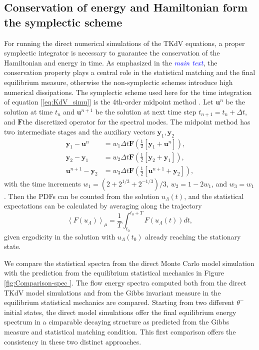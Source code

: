 \documentclass[9pt,twoside,lineno]{pnas-new}
\theoremstyle{plain}
\theoremstyle{plain}
\begin{document}
\subsection{Conservation of energy and Hamiltonian form the symplectic scheme}

For running the direct numerical simulations of the TKdV equations,
a proper symplectic integrator is necessary to guarantee the conservation
of the Hamiltonian and energy in time. As emphasized in the \textcolor{blue}{\emph{main
text}}, the conservation property plays a central role in the statistical
matching and the final equilibrium measure, otherwise the non-symplectic
schemes introduce high numerical dissipations. The symplectic scheme
used here for the time integration of equation [\ref{eq:KdV_simu}]
is the 4th-order midpoint method \cite{mclachlan1993symplectic}.
Let $\mathbf{u}^{n}$ be the solution at time $t_{n}$ and $\mathbf{u}^{n+1}$
be the solution at next time step $t_{n+1}=t_{n}+\Delta t$, and $\mathbf{F}$the
discretized operator for the spectral modes. The midpoint method has
two intermediate stages and the auxiliary vectors $\mathbf{y}_{1},\mathbf{y}_{2}$
\[
\begin{aligned}\mathbf{y}_{1}-\mathbf{u}^{n} & =w_{1}\Delta t\mathbf{F}\left(\frac{1}{2}\left[\mathbf{y}_{1}+\mathbf{u}^{n}\right]\right),\\
\mathbf{y}_{2}-\mathbf{y}_{1} & =w_{2}\Delta t\mathbf{F}\left(\frac{1}{2}\left[\mathbf{y}_{2}+\mathbf{y}_{1}\right]\right),\\
\mathbf{u}^{n+1}-\mathbf{y}_{2} & =w_{3}\Delta t\mathbf{F}\left(\frac{1}{2}\left[\mathbf{u}^{n+1}+\mathbf{y}_{2}\right]\right),
\end{aligned}
\]
with the time increments $w_{1}=\left(2+2^{1/3}+2^{-1/3}\right)/3$,
$w_{2}=1-2w_{1}$, and $w_{3}=w_{1}$. Then the PDFs can be counted
from the solution $u_{\Lambda}\left(t\right)$, and the statistical
expectations can be calculated by averaging along the trajectory
\[
\left\langle F\left(u_{\Lambda}\right)\right\rangle _{\mu}=\frac{1}{T}\int_{t_{0}}^{t_{0}+T}F\left(u_{\Lambda}\left(t\right)\right)dt,
\]
given ergodicity in the solution with $u_{\Lambda}\left(t_{0}\right)$
already reaching the stationary state.

We compare the statistical spectra from the direct Monte Carlo model
simulation with the prediction from the equilibrium statistical mechanics
in Figure \ref{fig:Comparison-spec }. The flow energy spectra computed
both from the direct TKdV model simulations and from the Gibbs invariant
measure in the equilibrium statistical mechanics are compared. Starting
from two different $\theta^{-}$ initial states, the direct model
simulations offer the final equilibrium energy spectrum in a cimparable
decaying structure as predicted from the Gibbs measure and statistical
matching condition. This first comparison offers the consistency in
these two distinct approaches.
\end{document}
